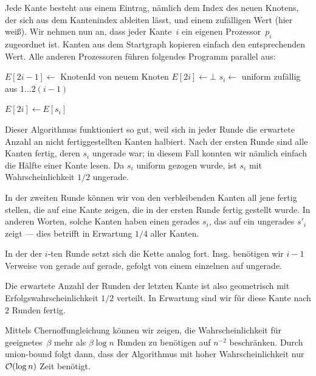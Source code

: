 \begin{center}
\end{center}

Jede Kante besteht aus einem  Eintrag, nämlich dem Index des neuen Knotens, der sich aus dem Kantenindex ableiten lässt, und einem zufälligen Wert (hier weiß).
Wir nehmen nun an, dass jeder Kante~$i$ ein eigenen Prozessor~$p_i$ zugeordnet ist.
Kanten aus dem Startgraph kopieren einfach den entsprechenden Wert.
Alle anderen Prozessoren führen folgendes Programm parallel aus:

\begin{algorithm}[H]
    $E[2i - 1] \gets$ KnotenId von neuem Knoten\;
    $E[2i] \gets \bot$\;
    \BlankLine
    $s_i \gets $ uniform zufällig aus $1 \ldots 2(i-1)$\;

    $E[2i] \gets E[s_i]$\;
\end{algorithm}

Dieser Algorithmus funktioniert so gut, weil sich in jeder Runde die erwartete Anzahl an nicht fertiggestellten Kanten halbiert.
Nach der ersten Runde sind alle Kanten fertig, deren $s_i$ ungerade war; in diesem Fall konnten wir nämlich einfach die  Hälfte einer Kante lesen.
Da $s_i$ uniform gezogen wurde, ist $s_i$ mit Wahrscheinlichkeit $1/2$ ungerade.

In der zweiten Runde können wir von den verbleibenden Kanten all jene fertig stellen, die auf eine Kante zeigen, die in der ersten Runde fertig gestellt wurde.
In anderen Worten, solche Kanten haben einen gerades $s_i$, das auf ein ungerades $s'_i$ zeigt --- dies betrifft in Erwartung $1/4$ aller Kanten.

In der der $i$-ten Runde setzt sich die Kette analog fort.
Insg. benötigen wir $i-1$ Verweise von gerade auf gerade, gefolgt von einem einzelnen auf ungerade.

Die erwartete Anzahl der Runden der letzten Kante ist also geometrisch mit Erfolgswahrscheinlichkeit $1/2$ verteilt.
In Erwartung sind wir für diese Kante nach $2$ Runden fertig.

Mittels Chernoffungleichung können wir zeigen, die Wahrscheinlichkeit für geeignetes~$\beta$ mehr als $\beta \log n$ Runden zu benötigen auf $n^{-2}$ beschränken.
Durch union-bound folgt dann, dass der Algorithmus mit hoher Wahrscheinlichkeit nur $\mathcal{O}\!\left(\log n\right)$ Zeit benötigt.
